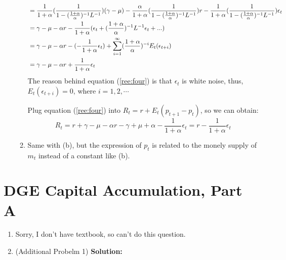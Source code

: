 \documentclass[11pt]{article} %
\begin{document}
\begin{enumerate}
\begin{enumerate}
\begin{align}
                   &=\frac{1}{1+\alpha}(\frac{1}{1-(\frac{1+\alpha}{\alpha})^{-1}L^{-1}})(\gamma-\mu)-\frac{\alpha}{1+\alpha}(\frac{1}{1-(\frac{1+\alpha}{\alpha})^{-1}L^{-1}})r-\frac{1}{1+\alpha}(\frac{1}{1-(\frac{1+\alpha}{\alpha})^{-1}L^{-1}})\epsilon_t\notag\\
                   &=\gamma-\mu-\alpha r-\frac{1}{1+\alpha}(\epsilon_t+(\frac{1+\alpha}{\alpha})^{-1}L^{-1}\epsilon_t+...)\notag\\
                   &=\gamma-\mu-\alpha r- (-\frac{1}{1+\alpha}\epsilon_t )+\sum_{i=1}^\infty (\frac{1+\alpha}{\alpha})^{-i}E_t(\epsilon_{t+i})\notag\\
                   &=\gamma-\mu-\alpha r +\frac{1}{1+\alpha} \epsilon_t\label{ree:four}
                \end{align}
                The reason behind equation (\ref{ree:four}) is that $\epsilon_t$ is white noise, thus,$E_t(\epsilon_{t+i})=0$, where $i=1,2,\cdots$

                Plug equation (\ref{ree:four}) into $R_t=r+E_t(p_{t+1}-p_t)$, so we can obtain:
                \begin{equation*}
                    R_t=r+\gamma-\mu-\alpha r-\gamma +\mu +\alpha-\frac{1}{1+\alpha}\epsilon_t=r-\frac{1}{1+\alpha}\epsilon_t
                \end{equation*}
        \item Same with (b), but the expression of $p_t$ is related to the monely supply of $m_t$ instead of a constant like (b).
    \end{enumerate}


\end{enumerate}





\section{DGE Capital Accumulation, Part A}

\begin{enumerate}
    \item Sorry, I don't have textbook, so can't do this question.
    \item (Additional Probelm 1)
     \textbf{Solution:}

     
\end{enumerate}
\end{document}
